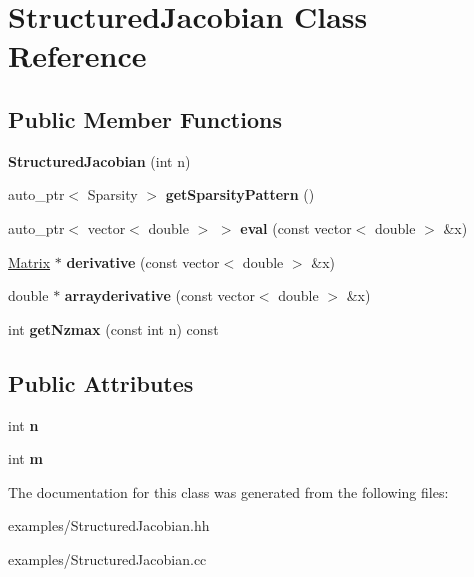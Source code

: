 \hypertarget{classStructuredJacobian}{
\section{StructuredJacobian Class Reference}
\label{classStructuredJacobian}
}
\subsection*{Public Member Functions}
\begin{DoxyCompactItemize}
\item 
\hypertarget{classStructuredJacobian_a0216141d95994988564f1790fa383b4d}{
{\bfseries StructuredJacobian} (int n)}
\label{classStructuredJacobian_a0216141d95994988564f1790fa383b4d}

\item 
\hypertarget{classStructuredJacobian_a5779429aac9b8779b356ef28b983b118}{
auto\_\-ptr$<$ Sparsity $>$ {\bfseries getSparsityPattern} ()}
\label{classStructuredJacobian_a5779429aac9b8779b356ef28b983b118}

\item 
\hypertarget{classStructuredJacobian_a9ff4b938253fcd4699eaba35ca7095dc}{
auto\_\-ptr$<$ vector$<$ double $>$ $>$ {\bfseries eval} (const vector$<$ double $>$ \&x)}
\label{classStructuredJacobian_a9ff4b938253fcd4699eaba35ca7095dc}

\item 
\hypertarget{classStructuredJacobian_a934845213ab9d431deb7fdffb18ea2ee}{
\hyperlink{classMatrix}{Matrix} $\ast$ {\bfseries derivative} (const vector$<$ double $>$ \&x)}
\label{classStructuredJacobian_a934845213ab9d431deb7fdffb18ea2ee}

\item 
\hypertarget{classStructuredJacobian_ac7bb7523ef0c55143901e6b697cc8e30}{
double $\ast$ {\bfseries arrayderivative} (const vector$<$ double $>$ \&x)}
\label{classStructuredJacobian_ac7bb7523ef0c55143901e6b697cc8e30}

\item 
\hypertarget{classStructuredJacobian_a7b3fc3204d863ba9a513df9de0184cd7}{
int {\bfseries getNzmax} (const int n) const }
\label{classStructuredJacobian_a7b3fc3204d863ba9a513df9de0184cd7}

\end{DoxyCompactItemize}
\subsection*{Public Attributes}
\begin{DoxyCompactItemize}
\item 
\hypertarget{classStructuredJacobian_a34e166b7cf8761257f5c87b0cbfd0534}{
int {\bfseries n}}
\label{classStructuredJacobian_a34e166b7cf8761257f5c87b0cbfd0534}

\item 
\hypertarget{classStructuredJacobian_a60ded81d1f6e64c9d8f8b374ce625927}{
int {\bfseries m}}
\label{classStructuredJacobian_a60ded81d1f6e64c9d8f8b374ce625927}

\end{DoxyCompactItemize}


The documentation for this class was generated from the following files:\begin{DoxyCompactItemize}
\item 
examples/StructuredJacobian.hh\item 
examples/StructuredJacobian.cc\end{DoxyCompactItemize}

